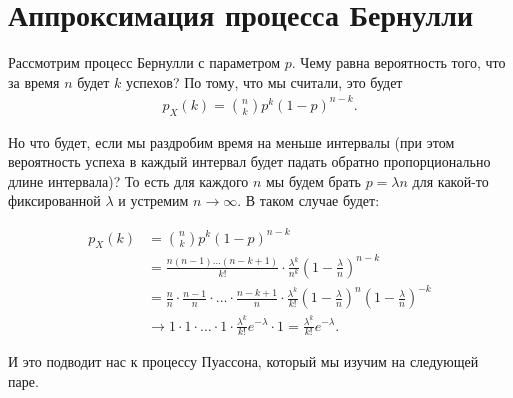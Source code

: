 \documentclass[12pt]{article}
\begin{document}
\section{Аппроксимация процесса Бернулли}

Рассмотрим процесс Бернулли с параметром $p$. Чему равна вероятность того, что за время $n$ будет $k$ успехов? По тому, что мы считали, это будет 
\begin{align*}
  p_X(k) = \binom{n}{k} p^k (1 - p)^{n - k}.
\end{align*}

Но что будет, если мы раздробим время на меньше интервалы (при этом вероятность успеха в каждый интервал будет падать обратно пропорционально длине интервала)? То есть для каждого $n$ мы будем брать $p = {\lambda}{n}$ для какой-то фиксированной $\lambda$ и устремим $n \to \infty$. В таком случае будет:

\begin{align*}
  p_X(k) &= \binom{n}{k} p^k (1 - p)^{n - k} \\
         &= \frac{n(n - 1)\dots(n - k+ 1)}{k!} \cdot \frac{\lambda^k}{n^k} \left(1 - \frac{\lambda}{n}\right)^{n - k} \\
         &= \frac{n}{n} \cdot \frac{n - 1}{n} \cdot \ldots \cdot \frac{n - k + 1}{n} \cdot \frac{\lambda^k}{k!} \left(1 - \frac{\lambda}{n}\right)^n \left(1 - \frac{\lambda}{n}\right)^{-k} \\
         &\to 1 \cdot 1 \cdot \ldots \cdot 1 \cdot \frac{\lambda^k}{k!}e^{-\lambda} \cdot 1 = \frac{\lambda^k}{k!}e^{-\lambda}.
\end{align*}

И это подводит нас к процессу Пуассона, который мы изучим на следующей паре.
\end{document}
